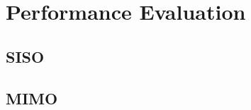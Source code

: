 \chapter{Performance Evaluation}



\section{SISO}\label{sec:siso}
  

%  

\section{MIMO}\label{sec:mimo}
   